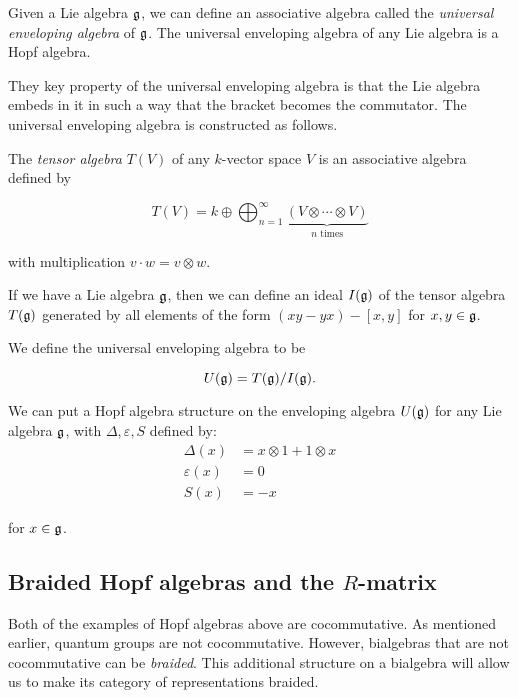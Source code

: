 \begin{example}
    \label{example:UEA}
    Given a Lie algebra $\mathfrak{g}$, we can define an associative algebra
    called the \emph{universal enveloping algebra} of $\mathfrak{g}$. The
    universal enveloping algebra of any Lie algebra is a Hopf algebra.

    They key property of the universal enveloping algebra is that the Lie
    algebra embeds in it in such a way that the bracket becomes the commutator.
    The universal enveloping algebra is constructed as follows.

    The \emph{tensor algebra} $T(V)$ of any $k$-vector space $V$ is an associative
    algebra defined by

    \begin{equation}
        T(V) = k \oplus \bigoplus_{n=1}^\infty \underbrace{(V \otimes \cdots \otimes V)}_{\text{$n$ times}}
    \end{equation}

    with multiplication $v \cdot w = v \otimes w$.

    If we have a Lie algebra $\mathfrak{g}$, then we can define an ideal
    $I(\mathfrak{g})$ of the tensor algebra $T(\mathfrak{g})$ generated by all
    elements of the form $(xy - yx) - \left[ x,y \right]$ for $x,y \in
    \mathfrak{g}$.

    We define the universal enveloping algebra to be 

    \begin{equation}
        U(\mathfrak{g}) = T(\mathfrak{g}) / I(\mathfrak{g}).
    \end{equation}

    We can put a Hopf algebra structure on the enveloping algebra
    $U(\mathfrak{g})$ for any Lie algebra $\mathfrak{g}$, with $\Delta,
    \varepsilon, S$ defined by: 
    \begin{align}
        \Delta(x) &= x \otimes 1 + 1 \otimes x \\
        \varepsilon(x) &= 0 \\
        S(x) &= -x  
    \end{align}

    for $x \in \mathfrak{g}$.

\end{example}

\subsection{Braided Hopf algebras and the $R$-matrix}
\label{subsection:R-matrix}

Both of the examples of Hopf algebras above are cocommutative. As mentioned
earlier, quantum groups are not cocommutative. However, bialgebras that are not
cocommutative can be \emph{braided}. This additional structure on a bialgebra
will allow us to make its category of representations braided.

